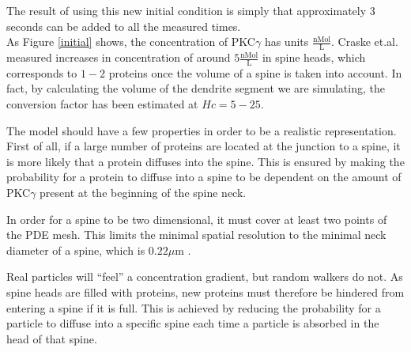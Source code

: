 \noindent The result of using this new initial condition is simply that approximately $3$ seconds can be added to all the measured times. \\

As Figure \ref{initial} shows, the concentration of PKC$\gamma$ has units $\frac{\text{nMol}}{\text{L}}$. 
Craske et.al. \cite{craske2005spines} measured increases in concentration of around $5\frac{\text{nMol}}{\text{L}}$ in spine heads, which corresponds to $1-2$ proteins once the volume of a spine is taken into account. 
In fact, by calculating the volume of the dendrite segment we are simulating, the conversion factor has been estimated at $Hc = 5-25$. 

The model should have a few properties in order to be a realistic representation. First of all, if a large number of proteins are located at the junction to a spine, it is more likely that a protein diffuses into the spine. This is ensured by making the probability for a protein to diffuse into a spine to be dependent on the amount of PKC$\gamma$ present at the beginning of the spine neck. 

In order for a spine to be two dimensional, it must cover at least two points of the PDE mesh. This limits the minimal spatial resolution to the minimal neck diameter of a spine, which is $0.22\mu$m \cite{arellano2007ultrastructure}.

Real particles will ``feel'' a concentration gradient, but random walkers do not. As spine heads are filled with proteins, new proteins must therefore be hindered from entering a spine if it is full. This is achieved by reducing the probability for a particle to diffuse into a specific spine each time a particle is absorbed in the head of that spine.

